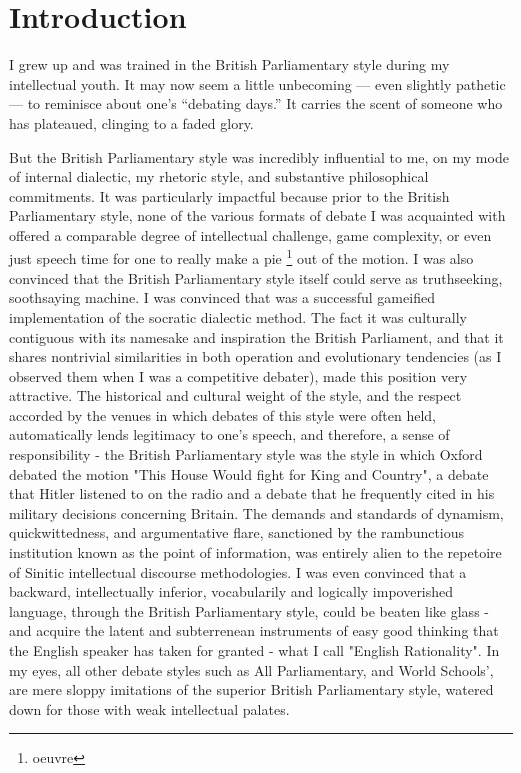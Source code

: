 \section{Introduction}

I grew up and was trained in the British Parliamentary style during my intellectual youth. It may now seem a little unbecoming — even slightly pathetic — to reminisce about one’s “debating days.” It carries the scent of someone who has plateaued, clinging to a faded glory. 

But the British Parliamentary style was incredibly influential to me, on my mode of internal dialectic, my rhetoric style, and substantive philosophical commitments. It was particularly impactful because prior to the British Parliamentary style, none of the various formats of debate I was acquainted with offered a comparable degree of intellectual challenge, game complexity, or even just speech time for one to really make a pie \footnote{oeuvre} out of the motion. I was also convinced that the British Parliamentary style itself could serve as truthseeking, soothsaying machine. I was convinced that was a successful gameified implementation of the socratic dialectic method. The fact it was culturally contiguous with its namesake and inspiration the British Parliament, and that it shares nontrivial similarities in both operation and evolutionary tendencies (as I observed them when I was a competitive debater), made this position very attractive. The historical and cultural weight of the style, and the respect accorded by the venues in which debates of this style were often held, automatically lends legitimacy to one's speech, and therefore, a sense of responsibility - the British Parliamentary style was the style in which Oxford debated the motion "This House Would fight for King and Country", a debate that Hitler listened to on the radio and a debate that he frequently cited in his military decisions concerning Britain. The demands and standards of dynamism, quickwittedness, and argumentative flare, sanctioned by the rambunctious institution known as the point of information, was entirely alien to the repetoire of Sinitic intellectual discourse methodologies. I was even convinced that a backward, intellectually inferior, vocabularily and logically impoverished language, through the British Parliamentary style, could be beaten like glass - and acquire the latent and subterrenean instruments of easy good thinking that the English speaker has taken for granted - what I call "English Rationality". In my eyes, all other debate styles such as All Parliamentary, and World Schools', are mere sloppy imitations of the superior British Parliamentary style, watered down for those with weak intellectual palates.

